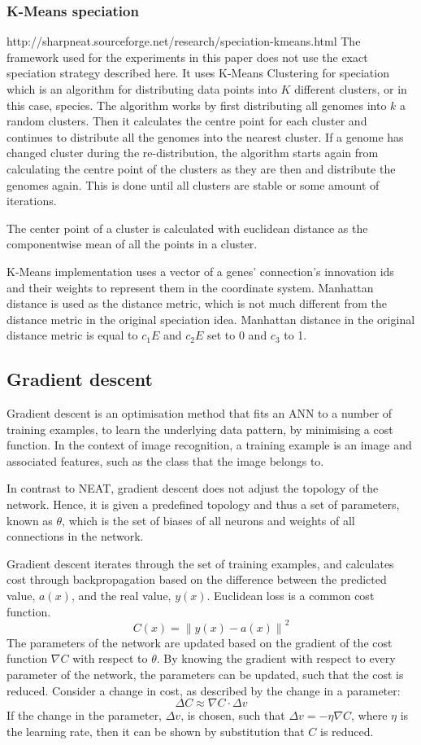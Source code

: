 \subsubsection{K-Means speciation} 
http://sharpneat.sourceforge.net/research/speciation-kmeans.html
The framework used for the experiments in this paper does not use the exact speciation strategy described here. It uses K-Means Clustering for speciation which is an algorithm for distributing data points into $K$ different clusters, or in this case, species. The algorithm works by first distributing all genomes into $k$ a random clusters. Then it calculates the centre point for each cluster and continues to distribute all the genomes into the nearest cluster. If a genome has changed cluster during the re-distribution, the algorithm starts again from calculating the centre point of the clusters as they are then and distribute the genomes again. This is done until all clusters are stable or some amount of iterations.

The center point of a cluster is calculated with euclidean distance as the componentwise mean of all the points in a cluster.

K-Means implementation uses a vector of a genes' connection's innovation ids and their weights to represent them in the coordinate system. Manhattan distance is used as the distance metric, which is not much different from the distance metric in the original speciation idea. Manhattan distance in the original distance metric is equal to ${c_1E}$ and ${c_2E}$ set to 0 and $c_3$ to 1.

\subsection{Gradient descent}
Gradient descent is an optimisation method that fits an ANN to a number of training examples, to learn the underlying data pattern, by minimising a cost function. In the context of image recognition, a training example is an image and associated features, such as the class that the image belongs to.

In contrast to NEAT, gradient descent does not adjust the topology of the network. Hence, it is given a predefined topology and thus a set of parameters, known as $\theta$, which is the set of biases of all neurons and weights of all connections in the network. 

Gradient descent iterates through the set of training examples, and calculates cost through backpropagation based on the difference between the predicted value, $a(x)$, and the real value, $y(x)$. Euclidean loss is a common cost function.
$$C(x) = {\lVert y(x) - a(x) \rVert}^2$$
The parameters of the network are updated based on the gradient of the cost function $\nabla C$ with respect to $\theta$. By knowing the gradient with respect to every parameter of the network, the parameters can be updated, such that the cost is reduced. Consider a change in cost, as described by the change in a parameter:
$$\Delta C \approx \nabla C \cdot \Delta v $$
If the change in the parameter, $\Delta v$, is chosen, such that $\Delta v = - \eta \nabla C$, where $\eta$ is the learning rate, then it can be shown by substitution that $C$ is reduced.

